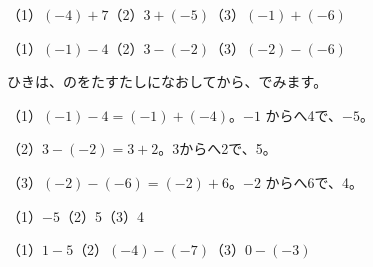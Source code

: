 \begin{jibun}
（1）$(-4)+7$\quad（2）$3+(-5)$\quad（3）$(-1)+(-6)$
\end{jibun}

\begin{reidai}[ひき\R{算}{ざん}]
（1）$(-1)-4$\quad（2）$3-(-2)$\quad（3）$(-2)-(-6)$\par
\kangaekata ひきは、のをたすたしになおしてから、でみます。\par
\begin{bkcenter}
\end{bkcenter}
\shiki （1）$(-1)-4=(-1)+(-4)$。$-1$ からへ4で、$-5$。\par
\hspace*{2.6\zw}（2）$3-(-2)=3+2$。3からへ2で、5。\par
\hspace*{2.6\zw}（3）$(-2)-(-6)=(-2)+6$。$-2$ からへ6で、4。\par
\kotae （1）$-5$\quad（2）5\quad（3）4
\end{reidai}

\begin{jibun}
（1）$1-5$\quad（2）$(-4)-(-7)$\quad（3）$0-(-3)$
\end{jibun}

